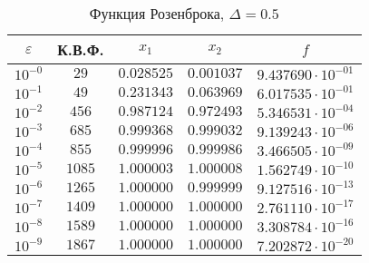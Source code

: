 \documentclass[a4paper,12pt,notitlepage,pdftex,headsepline]{scrartcl}
\begin{document}
        \begin{table}[ht]
          \centering
          \caption{Функция Розенброка, $\Delta = 0.5$}
          \begin{tabular}{|c|c|c|c|c|}
            \hline
            $\varepsilon$ & К.В.Ф. & $x_1$ & $x_2$ & $f$\\
            \hline
            $10^{-0}$ & $29$ & $0.028525$ & $0.001037$ & $9.437690\cdot 10^{-01}$\\
            $10^{-1}$ & $49$ & $0.231343$ & $0.063969$ & $6.017535\cdot 10^{-01}$\\
            $10^{-2}$ & $456$ & $0.987124$ & $0.972493$ & $5.346531\cdot 10^{-04}$\\
            $10^{-3}$ & $685$ & $0.999368$ & $0.999032$ & $9.139243\cdot 10^{-06}$\\
            $10^{-4}$ & $855$ & $0.999996$ & $0.999986$ & $3.466505\cdot 10^{-09}$\\
            $10^{-5}$ & $1085$ & $1.000003$ & $1.000008$ & $1.562749\cdot 10^{-10}$\\
            $10^{-6}$ & $1265$ & $1.000000$ & $0.999999$ & $9.127516\cdot 10^{-13}$\\
            $10^{-7}$ & $1409$ & $1.000000$ & $1.000000$ & $2.761110\cdot 10^{-17}$\\
            $10^{-8}$ & $1589$ & $1.000000$ & $1.000000$ & $3.308784\cdot 10^{-16}$\\
            $10^{-9}$ & $1867$ & $1.000000$ & $1.000000$ & $7.202872\cdot 10^{-20}$\\
            \hline
          \end{tabular}
        \end{table}
\end{document}
